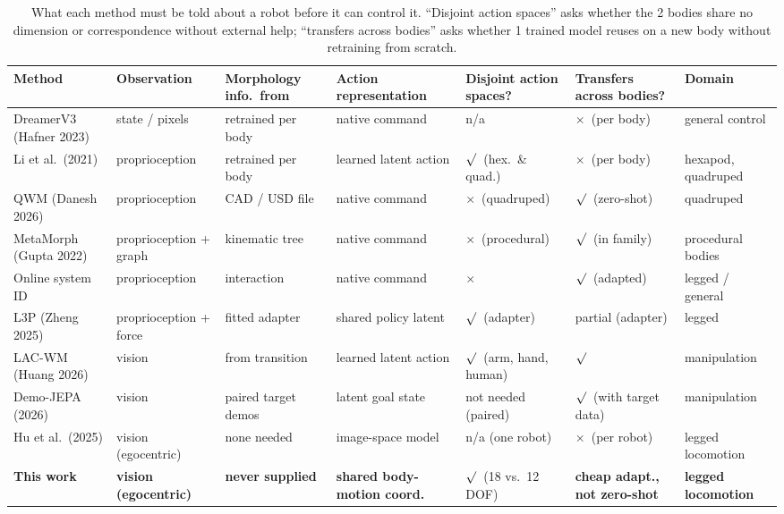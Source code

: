 \documentclass[12pt,a4paper,oneside]{report}
\providecommand{\checkmark}{\ensuremath{\surd}}
\newcommand{\yes}{\ensuremath{\checkmark}}
\newcommand{\no}{\ensuremath{\times}}
\begin{document}
\begin{table}[H]
\centering
\scriptsize
\setlength{\tabcolsep}{3pt}
\caption{What each method must be told about a robot before it can control it. ``Disjoint action spaces''
asks whether the 2 bodies share no dimension or correspondence without external help; ``transfers across bodies''
asks whether 1 trained model reuses on a new body without retraining from scratch.}
\label{tab:positioning}
\begin{tabularx}{\textwidth}{>{\hsize}Y>{\hsize}Y>{\hsize}Y>{\hsize}Y>{\hsize\centering\arraybackslash}Y>{\hsize\centering\arraybackslash}Y>{\hsize}Y}
\toprule
\textbf{Method} & \textbf{Observation} & \textbf{Morphology info.\ from} & \textbf{Action representation} & \textbf{Disjoint action spaces?} & \textbf{Transfers across bodies?} & \textbf{Domain}\\
\midrule
DreamerV3 (Hafner 2023) & state / pixels & retrained per body & native command & n/a & \no\ (per body) & general control\\
Li et al.\ (2021) & proprioception & retrained per body & learned latent action & \yes\ (hex.\ \& quad.) & \no\ (per body) & hexapod, quadruped\\
QWM (Danesh 2026) & proprioception & CAD / USD file & native command & \no\ (quadruped) & \yes\ (zero-shot) & quadruped\\
MetaMorph (Gupta 2022) & proprioception + graph & kinematic tree & native command & \no\ (procedural) & \yes\ (in family) & procedural bodies\\
Online system ID & proprioception & interaction & native command & \no & \yes\ (adapted) & legged / general\\
L3P (Zheng 2025) & proprioception + force & fitted adapter & shared policy latent & \yes\ (adapter) & partial (adapter) & legged\\
LAC-WM (Huang 2026) & vision & from transition & learned latent action & \yes\ (arm, hand, human) & \yes & manipulation\\
Demo-JEPA (2026) & vision & paired target demos & latent goal state & not needed (paired) & \yes\ (with target data) & manipulation\\
Hu et al.\ (2025) & vision (egocentric) & none needed & image-space model & n/a (one robot) & \no\ (per robot) & legged locomotion\\
\textbf{This work} & \textbf{vision (egocentric)} & \textbf{never supplied} & \textbf{shared body-motion coord.} & \yes\ (18 vs.\ 12 DOF) & \textbf{cheap adapt., not zero-shot} & \textbf{legged locomotion}\\
\bottomrule
\end{tabularx}
\end{table}
\end{document}
